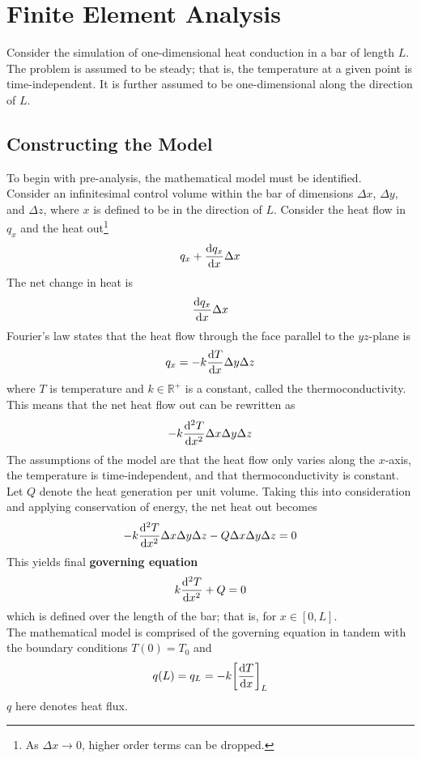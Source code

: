 \documentclass{article}
\newcommand{\R}{\mathbb{R}}
\begin{document}
	\section{Finite Element Analysis}
		Consider the simulation of one-dimensional heat conduction in a bar of length \(L\). The problem is assumed to be steady; that is, the temperature at a given point is time-independent. It is further assumed to be one-dimensional along the direction of \(L\).
		\subsection*{Constructing the Model}
			To begin with pre-analysis, the mathematical model must be identified. \\
			Consider an infinitesimal control volume within the bar of dimensions \(\Delta x\), \(\Delta y\), and \(\Delta z\), where \(x\) is defined to be in the direction of \(L\).  Consider the heat flow in \(q_x\) and the heat out\footnote{As \(\Delta x \to 0\), higher order terms can be dropped.}
				\[q_x + \dv{q_x}{x}\Delta x\]
			The net change in heat is
				\[\dv{q_x}{x}\Delta x\]
			Fourier's law states that the heat flow through the face parallel to the \(yz\)-plane is
				\[q_x = -k\dv{T}{x}\Delta y\Delta z\]
			where \(T\) is temperature and \(k \in \R^+\) is a constant, called the thermoconductivity. This means that the net heat flow out can be rewritten as
				\[-k\dv[2]{T}{x}\Delta x\Delta y \Delta z\]
			The assumptions of the model are that the heat flow only varies along the \(x\)-axis, the temperature is time-independent, and that thermoconductivity is constant. \\
			Let \(Q\) denote the heat generation per unit volume. Taking this into consideration and applying conservation of energy, the net heat out becomes
				\[-k\dv[2]{T}{x}\Delta x \Delta y \Delta z - Q\Delta x \Delta y \Delta z = 0\]
			This yields final \textbf{governing equation}
				\[k\dv[2]{T}{x} + Q = 0\]
			which is defined over the length of the bar; that is, for \(x \in [0, L]\). \\
			The mathematical model is comprised of the governing equation in tandem with the boundary conditions \(T(0) = T_0\) and
				\[q(L) = q_L = -k\qty[\dv{T}{x}]_L\]
			\(q\) here denotes heat flux.
\end{document}
